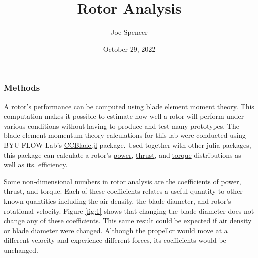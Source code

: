 \documentclass{article}
\begin{document}
\author{Joe Spencer}
\title{Rotor Analysis}
\date{October 29, 2022}
\maketitle

\subsubsection*{Methods}

A rotor's performance can be computed using  \hyperlink{BEM}{blade element moment theory}. This computation makes it possible to estimate how well a rotor will perform under various conditions without having to produce and test many prototypes. The blade element momentum theory calculations for this lab were conducted using BYU FLOW Lab's \href{https://flow.byu.edu/CCBlade.jl/stable/}{CCBlade.jl} package. Used together with other julia packages, this package can calculate a rotor's \hyperlink{CP}{power}, \hyperlink{CT}{thrust}, and \hyperlink{CQ}{torque} distributions as well as its. \hyperlink{eta}{efficiency}. \newline

Some non-dimensional numbers in rotor analysis are the coefficients of power, thrust, and torque. Each of these coefficients relates a useful quantity to other known quantities including the air density, the blade diameter, and rotor's rotational velocity. Figure \ref{fig:1} shows that changing the blade diameter does not change any of these coefficients. This same result could be expected if air density or blade diameter were changed. Although the propellor would move at a different velocity and experience different forces, its coefficients would be unchanged. \newline
\end{document}
